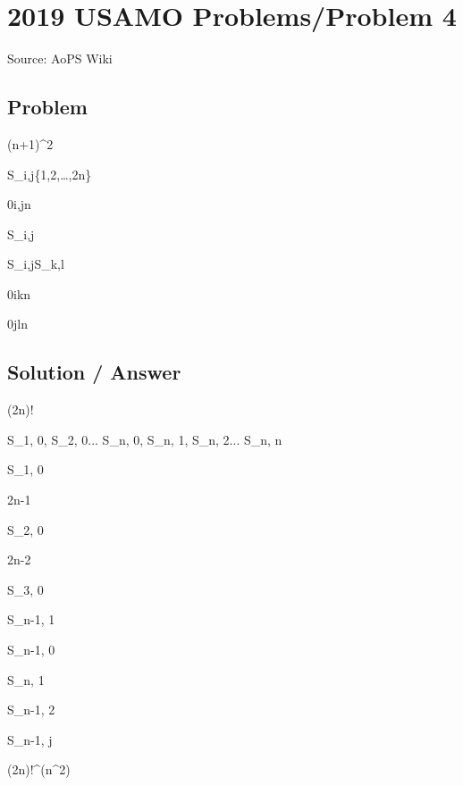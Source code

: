\documentclass[12pt]{article}
\begin{document}
\section*{2019 USAMO Problems/Problem 4}
Source: AoPS Wiki

\subsection*{Problem}
(n+1)^2

S_{i,j}\subseteq\{1,2,\ldots,2n\}

0\leq i,j\leq n

\bullet

S_{i,j}

S_{i,j}\subseteq S_{k,l}

0\leq i\leq k\leq n

0\leq j\leq l\leq n

\subsection*{Solution / Answer}
(2n)!

S_{1, 0}, S_{2, 0}... S_{n, 0}, S_{n, 1}, S_{n, 2}... S_{n, n}

S_{1, 0}

2n-1

S_{2, 0}

2n-2

S_{3, 0}

S_{n-1, 1}

S_{n-1, 0}

S_{n, 1}

S_{n-1, 2}

S_{n-1, j}

(2n)!^{\left(n^2\right)}
\end{document}
